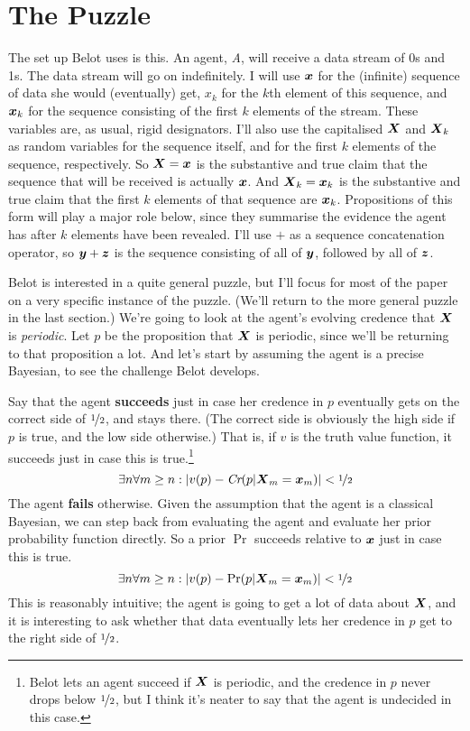 \section{The Puzzle}

The set up Belot uses is this. An agent, \textit{A}, will receive a data stream of 0s and 1s. The data stream will go on indefinitely. I will use $\boldsymbol{x}$ for the (infinite) sequence of data she would (eventually) get, $x_k$ for the $k$th element of this sequence, and $\boldsymbol{x}_k$ for the sequence consisting of the first $k$ elements of the stream. These variables are, as usual, rigid designators. I'll also use the capitalised $\boldsymbol{X}$ and $\boldsymbol{X}_k$ as random variables for the sequence itself, and for the first $k$ elements of the sequence, respectively. So $\boldsymbol{X} = \boldsymbol{x}$ is the substantive and true claim that the sequence that will be received is actually $\boldsymbol{x}$. And $\boldsymbol{X}_k = \boldsymbol{x}_k$ is the substantive and true claim that the first $k$ elements of that sequence are $\boldsymbol{x}_k$. Propositions of this form will play a major role below, since they summarise the evidence the agent has after $k$ elements have been revealed. I'll use $+$ as a sequence concatenation operator, so $\boldsymbol{y} + \boldsymbol{z}$ is the sequence consisting of all of $\boldsymbol{y}$, followed by all of $\boldsymbol{z}$.

Belot is interested in a quite general puzzle, but I'll focus for most of the paper on a very specific instance of the puzzle. (We'll return to the more general puzzle in the last section.) We're going to look at the agent's evolving credence that $\boldsymbol{X}$ is \textit{periodic}. Let $p$ be the proposition that $\boldsymbol{X}$ is periodic, since we'll be returning to that proposition a lot. And let's start by assuming the agent is a precise Bayesian, to see the challenge Belot develops.

Say that the agent \textbf{succeeds} just in case her credence in $p$ eventually gets on the correct side of $\nicefrac{1}{2}$, and stays there. (The correct side is obviously the high side if $p$ is true, and the low side otherwise.) That is, if $v$ is the truth value function, it succeeds just in case this is true.\footnote{Belot lets an agent succeed if $\boldsymbol{X}$ is periodic, and the credence in $p$ never drops below $\nicefrac{1}{2}$, but I think it's neater to say that the agent is undecided in this case.}
\[
\exists n \forall m \geq n: |v(p) - \textit{Cr}(p | \boldsymbol{X}_m = \boldsymbol{x}_m)| < \nicefrac{1}{2}
\]
The agent \textbf{fails} otherwise. Given the assumption that the agent is a classical Bayesian, we can step back from evaluating the agent and evaluate her prior probability function directly. So a prior $\Pr$ succeeds relative to $\boldsymbol{x}$ just in case this is true.
\[
\exists n \forall m \geq n: |v(p) - \Pr(p | \boldsymbol{X}_m = \boldsymbol{x}_m)| < \nicefrac{1}{2}
\]
This is reasonably intuitive; the agent is going to get a lot of data about $\boldsymbol{X}$, and it is interesting to ask whether that data eventually lets her credence in $p$ get to the right side of $\nicefrac{1}{2}$. 

